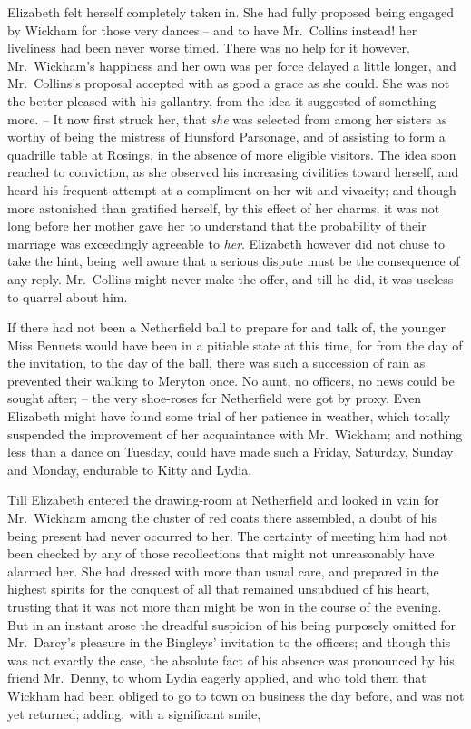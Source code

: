 Elizabeth felt herself completely taken in. She had
fully proposed being engaged by Wickham for those
very dances:-- and to have Mr.\ Collins instead! her liveliness
had been never worse timed. There was no help for
it however. Mr.\ Wickham’s happiness and her own was
per force delayed a little longer, and Mr.\ Collins’s proposal
accepted with as good a grace as she could. She was not
the better pleased with his gallantry, from the idea it
suggested of something more. -- It now first struck her,
that \textit{she} was selected from among her sisters as worthy
of being the mistress of Hunsford Parsonage, and of
assisting to form a quadrille table at Rosings, in the
absence of more eligible visitors. The idea soon reached
to conviction, as she observed his increasing civilities
toward herself, and heard his frequent attempt at a compliment
on her wit and vivacity; and though more astonished
than gratified herself, by this effect of her charms,
it was not long before her mother gave her to understand
that the probability of their marriage was exceedingly
agreeable to \textit{her}. Elizabeth however did not chuse to take
the hint, being well aware that a serious dispute must be
the consequence of any reply. Mr.\ Collins might never
make the offer, and till he did, it was useless to quarrel
about him.

If there had not been a Netherfield ball to prepare for
and talk of, the younger Miss Bennets would have been
in a pitiable state at this time, for from the day of the
invitation, to the day of the ball, there was such a succession
of rain as prevented their walking to Meryton once.
No aunt, no officers, no news could be sought after; -- the
very shoe-roses for Netherfield were got by proxy. Even
Elizabeth might have found some trial of her patience
in weather, which totally suspended the improvement of
her acquaintance with Mr.\ Wickham; and nothing less
than a dance on Tuesday, could have made such a Friday,
Saturday, Sunday and Monday, endurable to Kitty and
Lydia.


Till Elizabeth entered the drawing-room at Netherfield
and looked in vain for Mr.\ Wickham among the cluster
of red coats there assembled, a doubt of his being present
had never occurred to her. The certainty of meeting him
had not been checked by any of those recollections that
might not unreasonably have alarmed her. She had
dressed with more than usual care, and prepared in the
highest spirits for the conquest of all that remained
unsubdued of his heart, trusting that it was not more
than might be won in the course of the evening. But
in an instant arose the dreadful suspicion of his being
purposely omitted for Mr.\ Darcy’s pleasure in the Bingleys’
invitation to the officers; and though this was not exactly
the case, the absolute fact of his absence was pronounced
by his friend Mr.\ Denny, to whom Lydia eagerly applied,
and who told them that Wickham had been obliged to go
to town on business the day before, and was not yet
returned; adding, with a significant smile,

